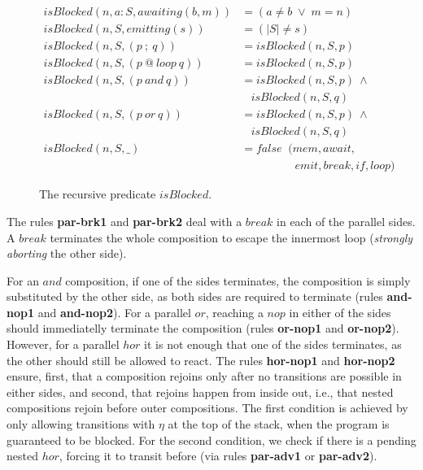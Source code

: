 \documentclass{acm_proc_article-sp}
\newcommand{\rr}[1] {{\textbf{\scriptsize{#1}}}}
\newcommand{\1}{\;}
\newcommand{\2}{\;\;}
\newcommand{\3}{\;\;\;}
\newcommand{\5}{\;\;\;\;\;}
\begin{document}
\begin{figure}[t]
{\small
\begin{align*}
  isBlocked(n,a:S, awaiting(b,m)) &= (a \neq b \1\vee\1 m = n)   \\
  isBlocked(n,S, emitting(s))    &= (|S| \neq s)                     \\
  isBlocked(n,S, (p~;~q))        &= isBlocked(n,S,p)             \\
  isBlocked(n,S, (p~@~loop~q))   &= isBlocked(n,S,p)             \\
  isBlocked(n,S, (p~and~q))      &= isBlocked(n,S,p)~\wedge
                               \\&~~~~isBlocked(n,S,q)             \\
  isBlocked(n,S, (p~or~q))       &= isBlocked(n,S,p)~\wedge
                               \\&~~~~isBlocked(n,S,q)             \\
  isBlocked(n,S, \_)             &= false \2  (mem,await,      \\
                                  &    \5\5\5\2 emit,break,if,loop)   %
\end{align*}
}%
\caption{
The recursive predicate $isBlocked$.
\label{fig.isBlocked}
}
\end{figure}

The rules \rr{par-brk1} and \rr{par-brk2} deal with a $break$ in each of the 
parallel sides.
A $break$ terminates the whole composition to escape the innermost loop 
(\emph{strongly aborting} the other side).

For an $and$ composition, if one of the sides terminates, the composition is 
simply substituted by the other side, as both sides are required to terminate 
(rules \rr{and-nop1} and \rr{and-nop2}).
%
For a parallel $or$, reaching a $nop$ in either of the sides should 
immediatelly terminate the composition (rules \rr{or-nop1} and \rr{or-nop2}).
%
However, for a parallel $hor$ it is not enough that one of the sides 
terminates, as the other should still be allowed to react.
The rules \rr{hor-nop1} and \rr{hor-nop2} ensure, first, that a composition 
rejoins only after no transitions are possible in either sides, and second, 
that rejoins happen from inside out, i.e., that nested compositions rejoin 
before outer compositions.
The first condition is achieved by only allowing transitions with $\eta$ at the 
top of the stack, when the program is guaranteed to be blocked.
For the second condition, we check if there is a pending nested $hor$, forcing 
it to transit before (via rules \rr{par-adv1} or \rr{par-adv2}).
\end{document}
